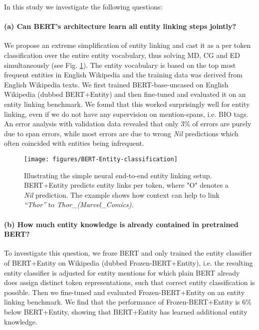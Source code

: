 \documentclass[11pt,a4paper]{article}
\begin{document}
In this study we investigate the following questions:  

\paragraph{(a) Can BERT's architecture learn all entity linking steps jointly?} We propose an extreme simplification of entity linking and cast it as a per token classification over the entire entity vocabulary, thus solving MD, CG and ED simultaneously (see Fig. \ref{fig:end2endel}). The entity vocabulary is based on the  top most frequent entities in English Wikipedia and the training data was derived from English Wikipedia texts. We first trained BERT-base-uncased on English Wikipedia (dubbed BERT+Entity) and then fine-tuned and evaluated it on an entity linking benchmark. We found that this worked surprisingly well for entity linking, even if we do not have any supervision on mention-spans, i.e. BIO tags. An error analysis with validation data revealed that only 3\% of errors are purely due to span errors, while most errors are due to wrong \textit{Nil} predictions which often coincided with entities being infrequent.

\begin{figure}
	\centering
	\texttt{[image: figures/BERT-Entity-classification]}
	\caption{Illustrating the simple neural end-to-end entity linking setup. BERT+Entity predicts entity links per token, where "O" denotes a \textit{Nil} prediction. The example shows how context can help to link \textit{``Thor''} to \textit{Thor\_(Marvel\_Comics)}.} 
	\label{fig:end2endel}
\end{figure}

\paragraph{(b) How much entity knowledge is already contained in pretrained BERT?} To investigate this question, we froze BERT and only trained the entity classifier of BERT+Entity on Wikipedia (dubbed Frozen-BERT+Entity), i.e. the resulting entity classifier is adjusted for entity mentions for which plain BERT already does assign distinct token representations, such that correct entity classification is possible. Then we fine-tuned and evaluated Frozen-BERT+Entity on an entity linking benchmark. We find that the performance of Frozen-BERT+Entity is 6\% below BERT+Entity, showing that BERT+Entity has learned additional entity knowledge. 
\end{document}
